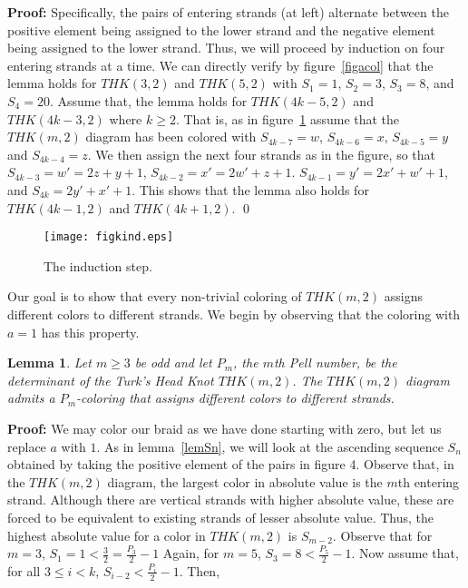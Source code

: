 \documentclass{amsart}
\newtheorem{lemma}[thm]{Lemma}
\begin{document}
{\noindent \textbf{Proof: }} 
Specifically, the pairs of entering strands (at left) alternate between the positive element being assigned to the lower strand and the negative element being assigned to the lower strand. Thus, we will proceed by induction on four entering strands at a time.  We can directly verify by figure~\ref{figacol} that the lemma holds for $THK(3,2)$ and $THK(5,2)$
with $S_1 = 1$, $S_2 = 3$, $S_3 = 8$, and $S_4 = 20$.  Assume that, the lemma holds for $THK(4k-5 ,2)$ and $THK(4k-3,2)$ where $k \geq 2$. That is, as in
figure~\ref{figkind} assume that the $THK(m,2)$ diagram has been colored with $S_{4k-7} = w$, $S_{4k-6} = x$, $S_{4k-5} = y$ and $S_{4k-4} = z$.
We then assign the next four strands as in the figure, so that
$S_{4k-3} = w' = 2z + y + 1$, $S_{4k-2} = x' = 2w' + z + 1$.
$S_{4k-1} = y' = 2x' + w' + 1$, and $S_{4k} = 2y' +x' +1$.
This shows that the lemma also holds for
$THK(4k-1,2)$ and $THK(4k+1,2)$. {\qed}

\medskip

\begin{figure}[ht]
\begin{center}
\texttt{[image: figkind.eps]}
\caption{The induction step.}\label{figkind}
\end{center}
\end{figure} 

Our goal is to show that every non-trivial coloring of $THK(m,2)$ assigns different colors to different strands. We begin by observing that the coloring with $a = 1$ has this property.

\begin{lemma}
\label{lema1}
Let $m \geq 3$ be odd and let $P_m$, the $m$th Pell number, be the determinant of the Turk's Head Knot $THK(m,2)$.
The $THK(m,2)$ diagram admits a $P_m$-coloring 
that assigns different colors to different strands.

\end{lemma}

{\noindent \textbf{Proof: }} We may color our braid as we have done starting with zero, but let us replace $a$ with $1$.  As in lemma~\ref{lemSn}, we will look at the ascending sequence $S_n$ obtained by taking the positive element of the pairs in figure 4.  Observe that, in the $THK(m,2)$ diagram, the largest color in absolute value is the $m$th entering strand.  Although there are vertical strands with higher absolute value, these are forced to be equivalent to existing strands of lesser absolute value.  Thus, the highest absolute value for a color in $THK(m,2)$ is $S_{m-2}$.  Observe that for $m=3$, $S_{1}=1< \frac32=\frac{P_{3}}{2}-1$  Again, for $m=5$, $S_{3}=8<\frac{P_{5}}{2}-1$.  Now assume that, for all $3 \leq i<k$, $S_{i-2}<\frac{P_{i}}{2}-1$.  Then,
\end{document}
